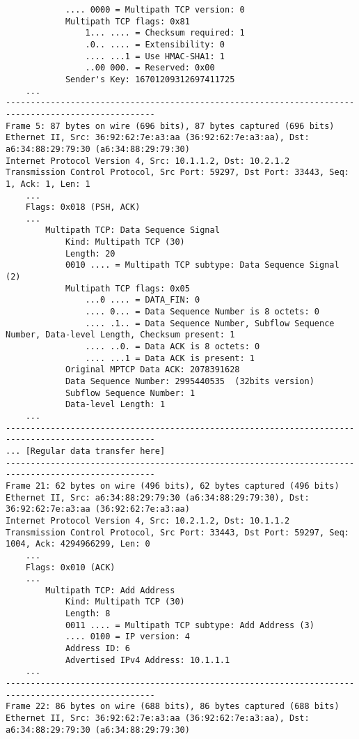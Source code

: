 \begin{verbatim}
            .... 0000 = Multipath TCP version: 0
            Multipath TCP flags: 0x81
                1... .... = Checksum required: 1
                .0.. .... = Extensibility: 0
                .... ...1 = Use HMAC-SHA1: 1
                ..00 000. = Reserved: 0x00
            Sender's Key: 16701209312697411725
    ...
----------------------------------------------------------------------------------------------------
Frame 5: 87 bytes on wire (696 bits), 87 bytes captured (696 bits)
Ethernet II, Src: 36:92:62:7e:a3:aa (36:92:62:7e:a3:aa), Dst: a6:34:88:29:79:30 (a6:34:88:29:79:30)
Internet Protocol Version 4, Src: 10.1.1.2, Dst: 10.2.1.2
Transmission Control Protocol, Src Port: 59297, Dst Port: 33443, Seq: 1, Ack: 1, Len: 1
    ...
    Flags: 0x018 (PSH, ACK)
    ...
        Multipath TCP: Data Sequence Signal
            Kind: Multipath TCP (30)
            Length: 20
            0010 .... = Multipath TCP subtype: Data Sequence Signal (2)
            Multipath TCP flags: 0x05
                ...0 .... = DATA_FIN: 0
                .... 0... = Data Sequence Number is 8 octets: 0
                .... .1.. = Data Sequence Number, Subflow Sequence Number, Data-level Length, Checksum present: 1
                .... ..0. = Data ACK is 8 octets: 0
                .... ...1 = Data ACK is present: 1
            Original MPTCP Data ACK: 2078391628
            Data Sequence Number: 2995440535  (32bits version)
            Subflow Sequence Number: 1
            Data-level Length: 1
    ...
----------------------------------------------------------------------------------------------------
... [Regular data transfer here]
----------------------------------------------------------------------------------------------------
Frame 21: 62 bytes on wire (496 bits), 62 bytes captured (496 bits)
Ethernet II, Src: a6:34:88:29:79:30 (a6:34:88:29:79:30), Dst: 36:92:62:7e:a3:aa (36:92:62:7e:a3:aa)
Internet Protocol Version 4, Src: 10.2.1.2, Dst: 10.1.1.2
Transmission Control Protocol, Src Port: 33443, Dst Port: 59297, Seq: 1004, Ack: 4294966299, Len: 0
    ...
    Flags: 0x010 (ACK)
    ...
        Multipath TCP: Add Address
            Kind: Multipath TCP (30)
            Length: 8
            0011 .... = Multipath TCP subtype: Add Address (3)
            .... 0100 = IP version: 4
            Address ID: 6
            Advertised IPv4 Address: 10.1.1.1
    ...
----------------------------------------------------------------------------------------------------
Frame 22: 86 bytes on wire (688 bits), 86 bytes captured (688 bits)
Ethernet II, Src: 36:92:62:7e:a3:aa (36:92:62:7e:a3:aa), Dst: a6:34:88:29:79:30 (a6:34:88:29:79:30)

\end{verbatim}
